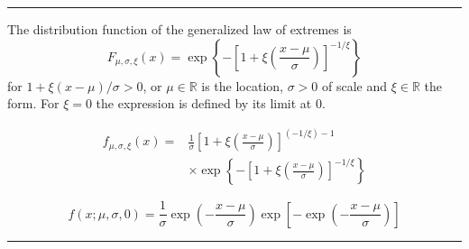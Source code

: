 \begin{f}
\begin{center}
\end{center}



\end{f}
\hrule

\begin{f}
The distribution function of the generalized law of extremes is
\[
F_{\mu,\sigma,\xi}(x) = \exp\left\{-\left[1+\xi\left(\frac{x-\mu}{\sigma}\right)\right]^{-1/\xi}\right\}
\]
for \(1+\xi(x-\mu)/\sigma>0\), or \(\mu\in\mathbb{R}\) is the location, \(\sigma>0\) of scale and  \(\xi\in\mathbb{R}\) the form. For \(\xi = 0\) the expression is defined by its limit at 0.

\begin{align*}
	f_{\mu,\sigma,\xi}(x) =& \frac{1}{\sigma}\left[1+\xi\left(\frac{x-\mu}{\sigma}\right)\right]^{(-1/\xi)-1}\\ &\times\exp\left\{-\left[1+\xi\left(\frac{x-\mu}{\sigma}\right)\right]^{-1/\xi}\right\}
\end{align*}

\[
f(x;\mu ,\sigma ,0)={\frac {1}{\sigma }}\exp \left(-{\frac {x-\mu }{\sigma }}\right)\exp \left[-\exp \left(-{\frac {x-\mu }{\sigma }}\right)\right]
\]

\end{f}
\hrule



